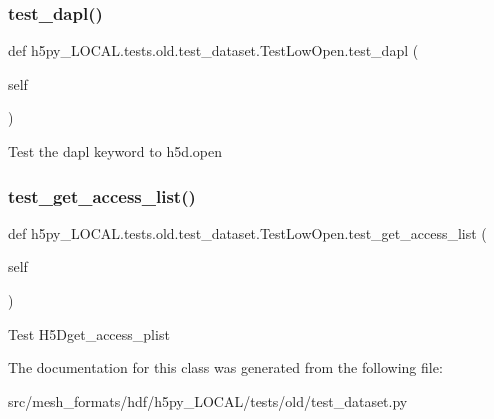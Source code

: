 \subsubsection{\texorpdfstring{test\+\_\+dapl()}{test\_dapl()}}
{\footnotesize\ttfamily def h5py\+\_\+\+L\+O\+C\+A\+L.\+tests.\+old.\+test\+\_\+dataset.\+Test\+Low\+Open.\+test\+\_\+dapl (\begin{DoxyParamCaption}\item[{}]{self }\end{DoxyParamCaption})}

\begin{DoxyVerb}Test the dapl keyword to h5d.open \end{DoxyVerb}
 \mbox{\label{classh5py__LOCAL_1_1tests_1_1old_1_1test__dataset_1_1TestLowOpen_a204f82c46e58d43bd46196ceb85d5798}} 
\subsubsection{\texorpdfstring{test\+\_\+get\+\_\+access\+\_\+list()}{test\_get\_access\_list()}}
{\footnotesize\ttfamily def h5py\+\_\+\+L\+O\+C\+A\+L.\+tests.\+old.\+test\+\_\+dataset.\+Test\+Low\+Open.\+test\+\_\+get\+\_\+access\+\_\+list (\begin{DoxyParamCaption}\item[{}]{self }\end{DoxyParamCaption})}

\begin{DoxyVerb}Test H5Dget_access_plist \end{DoxyVerb}
 

The documentation for this class was generated from the following file\+:\begin{DoxyCompactItemize}
\item 
src/mesh\+\_\+formats/hdf/h5py\+\_\+\+L\+O\+C\+A\+L/tests/old/test\+\_\+dataset.\+py\end{DoxyCompactItemize}
